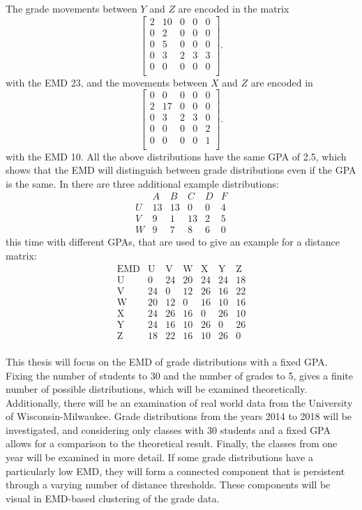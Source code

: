 \documentclass[12pt,letterpaper,oneside,openany]{book}
\begin{document}
The grade movements between $Y$ and $Z$ are encoded in the matrix
\[
\left[
\begin{array}{ccccc}
2 & 10 & 0 & 0 & 0 \\
0 & 2 & 0 & 0 & 0 \\
0 & 5 & 0 & 0 & 0 \\
0 & 3 & 2 & 3 & 3 \\
0 & 0 & 0 & 0 & 0 \\
\end{array}
\right].
\]
with the EMD 23, and the movements between $X$ and $Z$ are encoded in
\[
\left[
\begin{array}{ccccc}
0 & 0 & 0 & 0 & 0 \\
2 & 17 & 0 & 0 & 0 \\
0 & 3 & 2 & 3 & 0 \\
0 & 0 & 0 & 0 & 2 \\
0 & 0 & 0 & 0 & 1 \\
\end{array}
\right].
\]
with the EMD 10.
All the above distributions have the same GPA of 2.5, which shows that the EMD will distinguish between grade distributions even if the GPA is the same.
In \cite{bourn2019expected} there are three additional example distributions:
\[
\begin{array}{c|ccccc}
& A &  B & C &  D & F \\ \hline
U& 13& 13& 0& 0& 4 \\
V& 9& 1& 13& 2& 5 \\
W& 9& 7& 8& 6& 0
\end{array}
\]
this time with different GPAs, that are used to give an example for a distance matrix:
\[
\begin{array}{c|cccccc}
\text{EMD} & \text{U} & \text{V} & \text{W} & \text{X} & \text{Y} & \text{Z} \\ \hline
\text{U} & 0 & 24 & 20 & 24 & 24 & 18 \\
\text{V} & 24 & 0 & 12 & 26 & 16 & 22 \\
\text{W} & 20 & 12 & 0 & 16 & 10 & 16 \\
\text{X} & 24 & 26 & 16 & 0 & 26 & 10 \\
\text{Y} & 24 & 16 & 10 & 26 & 0 & 26 \\
\text{Z} & 18 & 22 & 16 & 10 & 26 & 0 \\
\end{array}
\]

This thesis will focus on the EMD of grade distributions with a fixed GPA. Fixing the number of students to 30 and the number of grades to 5, gives a finite number of possible distributions, which will be examined theoretically. 
Additionally, there will be an examination of real world data from the University of Wisconsin-Milwaukee. Grade distributions from the years 2014 to 2018 will be investigated, and considering only classes with 30 students and a fixed GPA allows for a comparison to the theoretical result.
Finally, the classes from one year will be examined in more detail. If some grade distributions have a particularly low EMD, they will form a connected component that is persistent through a varying number of distance thresholds. These components will be visual in EMD-based clustering of the grade data.
\end{document}
